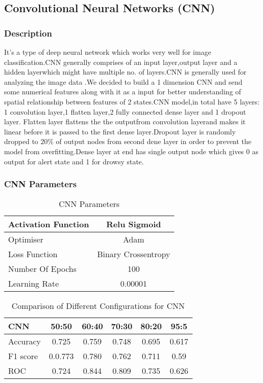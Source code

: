\documentclass{article}
\begin{document}
\subsection{Convolutional Neural Networks (CNN)}
 \subsubsection{Description}
It’s a type of deep neural network which works very well for image classification.CNN generally comprises of an input layer,output layer and a hidden layerwhich might have multiple no. of layers.CNN is generally used for analyzing the image data .We decided to build a 1 dimension CNN and send some numerical features along with it as a input for better understanding of spatial relationship between features of 2 states.CNN model,in total have 5 layers: 1 convolution layer,1 flatten layer,2 fully connected dense layer and 1 dropout layer. Flatten layer flattens the the outputfrom convolution layerand makes it linear before it is passed to the first dense layer.Dropout layer is randomly dropped to 20\% of output nodes from second dene layer in order to prevent the model from overfitting.Dense layer at end has single output node which gives 0 as output for alert state and 1 for drowsy state.
 \subsubsection{CNN Parameters}
 \begin{table}[!h]
\centering
\begin{tabular}{|l|c|}


\hline
Activation Function & Relu Sigmoid \\
\hline
Optimiser & Adam\\
\hline
Loss Function & Binary Crossentropy\\
\hline
Number Of Epochs & 100\\
\hline
Learning Rate & 0.00001\\
\hline

\end{tabular}
\caption{CNN Parameters}
\label{tbl:dataset}

\end{table}

 

\begin{table}[!h]
\centering
\begin{tabular}{|l|c|c|c|c|c|}
\hline
\textbf{CNN} &  \textbf{50:50} &  \textbf{60:40} &  \textbf{70:30} &  \textbf{80:20} &  \textbf{95:5} \\
\hline
Accuracy & 0.725 & 0.759 & 0.748 & 0.695 & 0.617 \\
\hline
F1 score & 0.0.773 & 0.780 & 0.762 & 0.711 & 0.59 \\
\hline
ROC & 0.724 & 0.844 & 0.809 & 0.735 & 0.626 \\
\hline


\end{tabular}
\caption{Comparison of Different Configurations for CNN}
\label{tbl:dataset}
\end{table}
\bigskip
\end{document}
